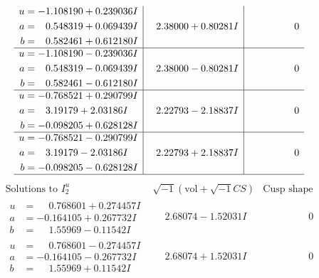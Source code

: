 \documentclass[1p]{elsarticle_modified}
\theoremstyle{definition}
\newcommand{\I}{\sqrt{-1}}
\begin{document}
$$\begin{array}{c|c|c}
\begin{aligned}
u &= -1.108190 + 0.239036 I \\
a &= \phantom{-}0.548319 + 0.069439 I \\
b &= \phantom{-}0.582461 + 0.612180 I\end{aligned}
 & \phantom{-}2.38000 + 0.80281 I & \phantom{-0.000000 } 0 \\ \hline\begin{aligned}
u &= -1.108190 - 0.239036 I \\
a &= \phantom{-}0.548319 - 0.069439 I \\
b &= \phantom{-}0.582461 - 0.612180 I\end{aligned}
 & \phantom{-}2.38000 - 0.80281 I & \phantom{-0.000000 } 0 \\ \hline\begin{aligned}
u &= -0.768521 + 0.290799 I \\
a &= \phantom{-}3.19179 + 2.03186 I \\
b &= -0.098205 + 0.628128 I\end{aligned}
 & \phantom{-}2.22793 - 2.18837 I & \phantom{-0.000000 } 0 \\ \hline\begin{aligned}
u &= -0.768521 - 0.290799 I \\
a &= \phantom{-}3.19179 - 2.03186 I \\
b &= -0.098205 - 0.628128 I\end{aligned}
 & \phantom{-}2.22793 + 2.18837 I & \phantom{-0.000000 } 0\\
 \hline 
 \end{array}$$\newpage$$\begin{array}{c|c|c}  
\text{Solutions to }I^u_{2}& \I (\text{vol} + \sqrt{-1}CS) & \text{Cusp shape}\\
 \hline 
\begin{aligned}
u &= \phantom{-}0.768601 + 0.274457 I \\
a &= -0.164105 + 0.267732 I \\
b &= \phantom{-}1.55969 - 0.11542 I\end{aligned}
 & \phantom{-}2.68074 - 1.52031 I & \phantom{-0.000000 } 0 \\ \hline\begin{aligned}
u &= \phantom{-}0.768601 - 0.274457 I \\
a &= -0.164105 - 0.267732 I \\
b &= \phantom{-}1.55969 + 0.11542 I\end{aligned}
 & \phantom{-}2.68074 + 1.52031 I & \phantom{-0.000000 } 0 \\ \hline\begin{aligned}

\end{aligned}
\end{array}$$
\end{document}
